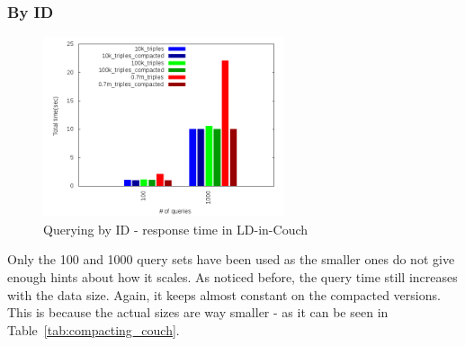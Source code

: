 \documentclass[a4paper,10pt]{article}
\begin{document}
\subsubsection{By ID}
\begin{figure}[h!]
  \centering
  \includegraphics[height=200px]{../couchdb/plots/plot_q_time_id.png}
  \caption{Querying by ID - response time in LD-in-Couch}
\end{figure}
Only the 100 and 1000 query sets have been used as the smaller ones do not give enough hints about how it scales.
As noticed before, the query time still increases with the data size. Again, it keeps almost constant on the compacted versions. This is 
because the actual sizes are way smaller - as it can be seen in Table~\ref{tab:compacting_couch}.
\end{document}
